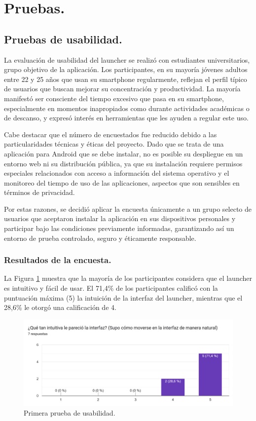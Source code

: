 \section{Pruebas.}
\subsection{Pruebas de usabilidad.}

La evaluación de usabilidad del launcher se realizó con estudiantes universitarios, grupo objetivo de la aplicación. Los participantes, en su mayoría jóvenes adultos entre 22 y 25 años que usan su smartphone regularmente, reflejan el perfil típico de usuarios que buscan mejorar su concentración y productividad. La mayoría manifestó ser consciente del tiempo excesivo que pasa en su smartphone, especialmente en momentos inapropiados como durante actividades académicas o de descanso, y expresó interés en herramientas que les ayuden a regular este uso.

Cabe destacar que el número de encuestados fue reducido debido a las particularidades técnicas y éticas del proyecto. Dado que se trata de una aplicación para Android que se debe instalar, no es posible su despliegue en un entorno web ni su distribución pública, ya que su instalación requiere permisos especiales relacionados con acceso a información del sistema operativo y el monitoreo del tiempo de uso de las aplicaciones, aspectos que son sensibles en términos de privacidad.

Por estas razones, se decidió aplicar la encuesta únicamente a un grupo selecto de usuarios que aceptaron instalar la aplicación en sus dispositivos personales y participar bajo las condiciones previamente informadas, garantizando así un entorno de prueba controlado, seguro y éticamente responsable.

\subsubsection{Resultados de la encuesta.}

La Figura \ref{fig:interfaz_intuitiva} muestra que la mayoría de los participantes considera que el launcher es intuitivo y fácil de usar. El 71,4\% de los participantes calificó con la puntuación máxima (5) la intuición de la interfaz del launcher, mientras que el 28,6\% le otorgó una calificación de 4.

\begin{figure}[h]
  \caption{Primera prueba de usabilidad.}
  \label{fig:interfaz_intuitiva}
  \includegraphics[width=\textwidth]{Figuras/interfaz_intuitiva.png}
  \centering
\end{figure}

